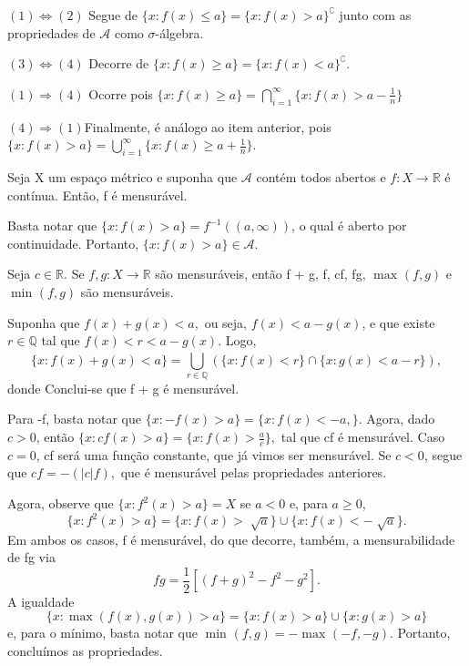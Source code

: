 \documentclass[MeasureTheory/measure_theory.tex]{subfiles}
\begin{document}
\begin{proof*}
	\((1) \Longleftrightarrow (2)\) Segue de \(\{x: f(x) \leq a\} = \{x: f(x) > a\}^{\complement}\) junto com as propriedades de \(\mathcal{A}\) como \(\sigma \)-álgebra.

	\((3) \Longleftrightarrow (4)\) Decorre de \(\{x: f(x) \geq a\} = \{x: f(x) < a\}^{\complement}.\)

	\((1) \Rightarrow (4)\) Ocorre pois \(\{x: f(x)\geq a\} = \bigcap_{i=1}^{\infty}\biggl\{x: f(x) > a - \frac{1}{n}\biggr\}\)

	\((4) \Rightarrow (1)\)Finalmente, é análogo ao item anterior, pois \(\{x: f(x) > a\} = \bigcup_{i=1}^{\infty}\biggl\{x: f(x)\geq a + \frac{1}{n}\biggr\}\). \qedsymbol
\end{proof*}
\begin{prop*}
	Seja X um espaço métrico e suponha que \( \mathcal{A}\) contém todos abertos e \(f:X\rightarrow \mathbb{R}\) é contínua. Então, f é mensurável.
\end{prop*}
\begin{proof*}
	Basta notar que \(\{x: f(x) > a\} = f^{-1}((a, \infty))\), o qual é aberto por continuidade. Portanto, \(\{x: f(x) > a\}\in \mathcal{A}\). \qedsymbol
\end{proof*}
\begin{prop*}
	Seja \(c\in \mathbb{R}.\) Se \(f, g:X\rightarrow \mathbb{R}\) são mensuráveis, então f + g, f, cf, fg, \(\max_{}(f, g)\) e \(\min_{}(f, g)\) são mensuráveis.
\end{prop*}
\begin{proof*}
	Suponha que \(f(x) + g(x) < a,\) ou seja, \(f(x) < a - g(x)\), e que existe \(r\in \mathbb{Q}\) tal que \(f(x) < r < a-g(x).\) Logo,
	\[
		\{x: f(x) + g(x) < a\} = \bigcup_{r\in \mathbb{Q}}^{}(\{x: f(x) < r\}\cap \{x: g(x) < a -r\}),
	\]
	donde Conclui-se que f + g é mensurável.

	Para -f, basta notar que \(\{x: -f(x) > a\} = \{x: f(x) < -a,\}\). Agora, dado \(c > 0\), então \(\{x: cf(x) > a\} = \{x: f(x) > \frac{a}{c}\},\) tal que cf é mensurável.
	Caso \(c=0\), cf será uma função constante, que já vimos ser mensurável. Se \(c < 0\), segue que \(cf = -(|c|f),\) que é mensurável pelas propriedades anteriores.

	Agora, observe que \(\{x: f^{2}(x) > a\} = X\) se \(a < 0\) e, para \(a \geq 0\),
	\[
		\{x: f^{2}(x) > a\} = \{x: f(x) > \sqrt[]{a}\}\cup \{x: f(x) < -\sqrt[]{a}\}.
	\]
	Em ambos os casos, f é mensurável, do que decorre, também, a mensurabilidade de fg via
	\[
		fg = \frac{1}{2}[(f+g)^{2} - f^{2}-g^{2}].
	\]
	A igualdade
	\[
		\{x:\max_{}(f(x), g(x)) > a\} = \{x: f(x) > a\}\cup \{x: g(x) > a\}
	\]
	e, para o mínimo, basta notar que \(\min_{}(f, g) = -\max_{}(-f, -g).\) Portanto, concluímos as propriedades. \qedsymbol
\end{proof*}
\end{document}
